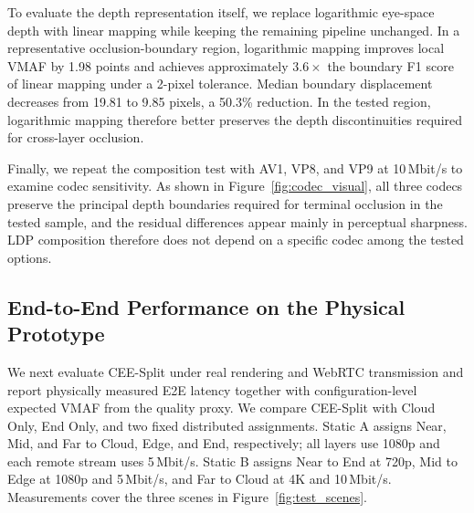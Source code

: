 \documentclass[acmsmall]{acmart}
\begin{document}
	To evaluate the depth representation itself, we replace logarithmic eye-space depth with linear mapping while keeping the remaining pipeline unchanged. In a representative occlusion-boundary region, logarithmic mapping improves local VMAF by 1.98 points and achieves approximately $3.6\times$ the boundary F1 score of linear mapping under a 2-pixel tolerance. Median boundary displacement decreases from 19.81 to 9.85 pixels, a 50.3\% reduction. In the tested region, logarithmic mapping therefore better preserves the depth discontinuities required for cross-layer occlusion.

	Finally, we repeat the composition test with AV1, VP8, and VP9 at 10\,Mbit/s to examine codec sensitivity. As shown in Figure~\ref{fig:codec_visual}, all three codecs preserve the principal depth boundaries required for terminal occlusion in the tested sample, and the residual differences appear mainly in perceptual sharpness. LDP composition therefore does not depend on a specific codec among the tested options.

	\FloatBarrier
	
	\subsection{End-to-End Performance on the Physical Prototype}
	\label{sec:physical_deployment}
	
	We next evaluate CEE-Split under real rendering and WebRTC transmission and report physically measured E2E latency together with configuration-level expected VMAF from the quality proxy. We compare CEE-Split with Cloud Only, End Only, and two fixed distributed assignments. Static A assigns Near, Mid, and Far to Cloud, Edge, and End, respectively; all layers use 1080p and each remote stream uses 5\,Mbit/s. Static B assigns Near to End at 720p, Mid to Edge at 1080p and 5\,Mbit/s, and Far to Cloud at 4K and 10\,Mbit/s. Measurements cover the three scenes in Figure~\ref{fig:test_scenes}.
\end{document}
